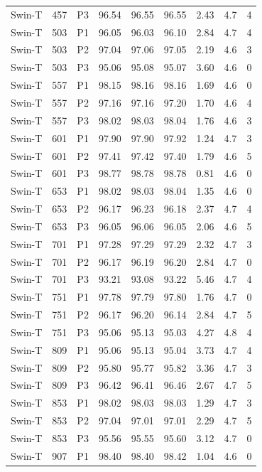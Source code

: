 {\begin{longtable}{lrlrrrrrr}
Swin-T & 457 & P3 & 96.54 & 96.55 & 96.55 & 2.43 & 4.7 & 4 \\
Swin-T & 503 & P1 & 96.05 & 96.03 & 96.10 & 2.84 & 4.7 & 4 \\
Swin-T & 503 & P2 & 97.04 & 97.06 & 97.05 & 2.19 & 4.6 & 3 \\
Swin-T & 503 & P3 & 95.06 & 95.08 & 95.07 & 3.60 & 4.6 & 0 \\
Swin-T & 557 & P1 & 98.15 & 98.16 & 98.16 & 1.69 & 4.6 & 0 \\
Swin-T & 557 & P2 & 97.16 & 97.16 & 97.20 & 1.70 & 4.6 & 4 \\
Swin-T & 557 & P3 & 98.02 & 98.03 & 98.04 & 1.76 & 4.6 & 3 \\
Swin-T & 601 & P1 & 97.90 & 97.90 & 97.92 & 1.24 & 4.7 & 3 \\
Swin-T & 601 & P2 & 97.41 & 97.42 & 97.40 & 1.79 & 4.6 & 5 \\
Swin-T & 601 & P3 & 98.77 & 98.78 & 98.78 & 0.81 & 4.6 & 0 \\
Swin-T & 653 & P1 & 98.02 & 98.03 & 98.04 & 1.35 & 4.6 & 0 \\
Swin-T & 653 & P2 & 96.17 & 96.23 & 96.18 & 2.37 & 4.7 & 4 \\
Swin-T & 653 & P3 & 96.05 & 96.06 & 96.05 & 2.06 & 4.6 & 5 \\
Swin-T & 701 & P1 & 97.28 & 97.29 & 97.29 & 2.32 & 4.7 & 3 \\
Swin-T & 701 & P2 & 96.17 & 96.19 & 96.20 & 2.84 & 4.7 & 0 \\
Swin-T & 701 & P3 & 93.21 & 93.08 & 93.22 & 5.46 & 4.7 & 4 \\
Swin-T & 751 & P1 & 97.78 & 97.79 & 97.80 & 1.76 & 4.7 & 0 \\
Swin-T & 751 & P2 & 96.17 & 96.20 & 96.14 & 2.84 & 4.7 & 5 \\
Swin-T & 751 & P3 & 95.06 & 95.13 & 95.03 & 4.27 & 4.8 & 4 \\
Swin-T & 809 & P1 & 95.06 & 95.13 & 95.04 & 3.73 & 4.7 & 4 \\
Swin-T & 809 & P2 & 95.80 & 95.77 & 95.82 & 3.36 & 4.7 & 3 \\
Swin-T & 809 & P3 & 96.42 & 96.41 & 96.46 & 2.67 & 4.7 & 5 \\
Swin-T & 853 & P1 & 98.02 & 98.03 & 98.03 & 1.29 & 4.7 & 3 \\
Swin-T & 853 & P2 & 97.04 & 97.01 & 97.01 & 2.29 & 4.7 & 5 \\
Swin-T & 853 & P3 & 95.56 & 95.55 & 95.60 & 3.12 & 4.7 & 0 \\
Swin-T & 907 & P1 & 98.40 & 98.40 & 98.42 & 1.04 & 4.6 & 0 \\

\end{longtable}}
